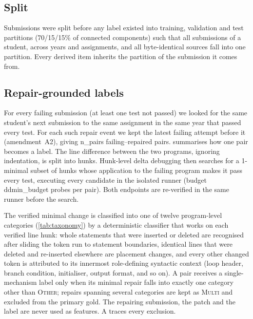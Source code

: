 \subsection{Split}
Submissions were split before any label existed into training, validation and test partitions (70/15/15\% of connected components) such that all submissions of a student, across years and assignments, and all byte-identical sources fall into one partition. Every derived item inherits the partition of the submission it comes from.

\subsection{Repair-grounded labels}\label{sec:real}
For every failing submission (at least one test not passed) we looked for the same student's next submission to the same assignment in the same year that passed every test. For each such repair event we kept the latest failing attempt before it (amendment~A2), giving {{n_pairs}} failing--repaired pairs.  summarises how one pair becomes a label. The line difference between the two programs, ignoring indentation, is split into hunks. Hunk-level delta debugging \citep{zeller2002ddmin} then searches for a 1-minimal subset of hunks whose application to the failing program makes it pass every test, executing every candidate in the isolated runner (budget {{ddmin_budget}} probes per pair). Both endpoints are re-verified in the same runner before the search.

The verified minimal change is classified into one of twelve program-level categories (\cref{tab:taxonomy}) by a deterministic classifier that works on each verified line hunk: whole statements that were inserted or deleted are recognised after sliding the token run to statement boundaries, identical lines that were deleted and re-inserted elsewhere are placement changes, and every other changed token is attributed to its innermost role-defining syntactic context (loop header, branch condition, initialiser, output format, and so on). A pair receives a single-mechanism label only when its minimal repair falls into exactly one category other than \textsc{Other}; repairs spanning several categories are kept as \textsc{Multi} and excluded from the primary gold. The repairing submission, the patch and the label are never used as features. A traces every exclusion.

